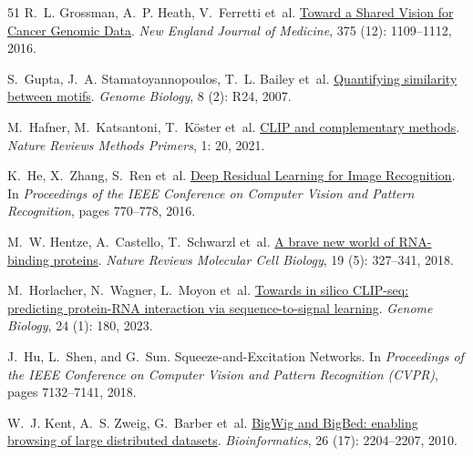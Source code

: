 \begin{thebibliography}{51}
R.~L. Grossman, A.~P. Heath, V.~Ferretti et~al.
\newblock \href{https://doi.org/10.1056/NEJMp1607591}{Toward a Shared Vision
  for Cancer Genomic Data}.
\newblock \emph{New England Journal of Medicine}, 375 (12):
  1109--1112, 2016.

S.~Gupta, J.~A. Stamatoyannopoulos, T.~L. Bailey et~al.
\newblock \href{https://doi.org/10.1186/gb-2007-8-2-r24}{Quantifying similarity
  between motifs}.
\newblock \emph{Genome Biology}, 8 (2): R24, 2007.

M.~Hafner, M.~Katsantoni, T.~K{\"o}ster et~al.
\newblock \href{https://doi.org/10.1038/s43586-021-00018-1}{CLIP and
  complementary methods}.
\newblock \emph{Nature Reviews Methods Primers}, 1: 20, 2021.

K.~He, X.~Zhang, S.~Ren et~al.
\newblock \href{https://doi.org/10.1109/CVPR.2016.90}{Deep Residual Learning
  for Image Recognition}.
\newblock In \emph{Proceedings of the IEEE Conference on Computer Vision and
  Pattern Recognition}, pages 770--778, 2016.

M.~W. Hentze, A.~Castello, T.~Schwarzl et~al.
\newblock \href{https://doi.org/10.1038/nrm.2017.130}{A brave new world of
  RNA-binding proteins}.
\newblock \emph{Nature Reviews Molecular Cell Biology}, 19
  (5): 327--341, 2018.

M.~Horlacher, N.~Wagner, L.~Moyon et~al.
\newblock \href{https://doi.org/10.1186/s13059-023-03015-7}{Towards in silico
  CLIP-seq: predicting protein-RNA interaction via sequence-to-signal
  learning}.
\newblock \emph{Genome Biology}, 24 (1): 180, 2023.

J.~Hu, L.~Shen, and G.~Sun.
\newblock Squeeze-and-Excitation Networks.
\newblock In \emph{Proceedings of the IEEE Conference on Computer Vision and
  Pattern Recognition (CVPR)}, pages 7132--7141, 2018.

W.~J. Kent, A.~S. Zweig, G.~Barber et~al.
\newblock \href{https://doi.org/10.1093/bioinformatics/btq351}{BigWig and
  BigBed: enabling browsing of large distributed datasets}.
\newblock \emph{Bioinformatics}, 26 (17): 2204--2207, 2010.


\end{thebibliography}
